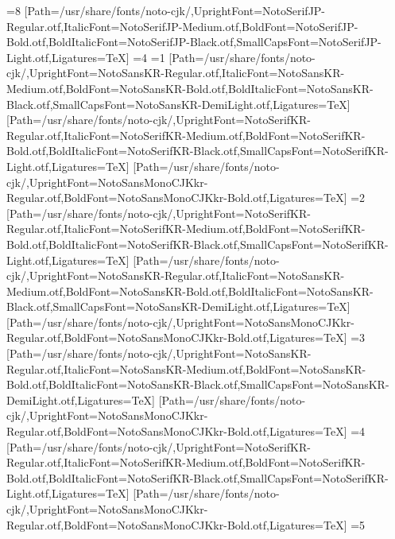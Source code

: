 \else\ifnum\value{CJKFonts}=8
[Path=/usr/share/fonts/noto-cjk/,UprightFont=NotoSerifJP-Regular.otf,ItalicFont=NotoSerifJP-Medium.otf,BoldFont=NotoSerifJP-Bold.otf,BoldItalicFont=NotoSerifJP-Black.otf,SmallCapsFont=NotoSerifJP-Light.otf,Ligatures=TeX]
\fi\fi\fi\fi\fi\fi\fi\fi\else
\ifnum\value{CJKLanguage}=4
\ifnum\value{CJKFonts}=1
[Path=/usr/share/fonts/noto-cjk/,UprightFont=NotoSansKR-Regular.otf,ItalicFont=NotoSansKR-Medium.otf,BoldFont=NotoSansKR-Bold.otf,BoldItalicFont=NotoSansKR-Black.otf,SmallCapsFont=NotoSansKR-DemiLight.otf,Ligatures=TeX]
[Path=/usr/share/fonts/noto-cjk/,UprightFont=NotoSerifKR-Regular.otf,ItalicFont=NotoSerifKR-Medium.otf,BoldFont=NotoSerifKR-Bold.otf,BoldItalicFont=NotoSerifKR-Black.otf,SmallCapsFont=NotoSerifKR-Light.otf,Ligatures=TeX]
[Path=/usr/share/fonts/noto-cjk/,UprightFont=NotoSansMonoCJKkr-Regular.otf,BoldFont=NotoSansMonoCJKkr-Bold.otf,Ligatures=TeX]
\else\ifnum\value{CJKFonts}=2
[Path=/usr/share/fonts/noto-cjk/,UprightFont=NotoSerifKR-Regular.otf,ItalicFont=NotoSerifKR-Medium.otf,BoldFont=NotoSerifKR-Bold.otf,BoldItalicFont=NotoSerifKR-Black.otf,SmallCapsFont=NotoSerifKR-Light.otf,Ligatures=TeX]
[Path=/usr/share/fonts/noto-cjk/,UprightFont=NotoSansKR-Regular.otf,ItalicFont=NotoSansKR-Medium.otf,BoldFont=NotoSansKR-Bold.otf,BoldItalicFont=NotoSansKR-Black.otf,SmallCapsFont=NotoSansKR-DemiLight.otf,Ligatures=TeX]
[Path=/usr/share/fonts/noto-cjk/,UprightFont=NotoSansMonoCJKkr-Regular.otf,BoldFont=NotoSansMonoCJKkr-Bold.otf,Ligatures=TeX]
\else\ifnum\value{CJKFonts}=3
[Path=/usr/share/fonts/noto-cjk/,UprightFont=NotoSansKR-Regular.otf,ItalicFont=NotoSansKR-Medium.otf,BoldFont=NotoSansKR-Bold.otf,BoldItalicFont=NotoSansKR-Black.otf,SmallCapsFont=NotoSansKR-DemiLight.otf,Ligatures=TeX]
[Path=/usr/share/fonts/noto-cjk/,UprightFont=NotoSansMonoCJKkr-Regular.otf,BoldFont=NotoSansMonoCJKkr-Bold.otf,Ligatures=TeX]
\else\ifnum\value{CJKFonts}=4
[Path=/usr/share/fonts/noto-cjk/,UprightFont=NotoSerifKR-Regular.otf,ItalicFont=NotoSerifKR-Medium.otf,BoldFont=NotoSerifKR-Bold.otf,BoldItalicFont=NotoSerifKR-Black.otf,SmallCapsFont=NotoSerifKR-Light.otf,Ligatures=TeX]
[Path=/usr/share/fonts/noto-cjk/,UprightFont=NotoSansMonoCJKkr-Regular.otf,BoldFont=NotoSansMonoCJKkr-Bold.otf,Ligatures=TeX]
\else\ifnum\value{CJKFonts}=5
